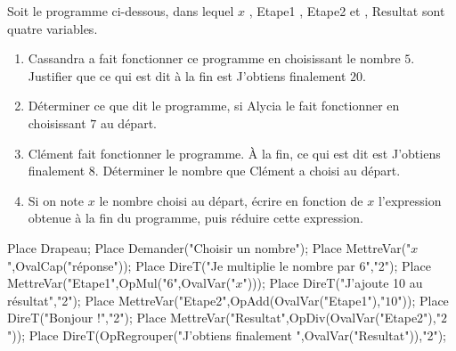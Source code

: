 \begin{exercice*}
    Soit le programme ci-dessous, dans lequel \og{} $x$ \fg{}, \og{} Etape1 \fg{}, \og{} Etape2 \fg{} et , \og{} Resultat \fg{} sont quatre variables.

    \begin{minipage}{0.45\linewidth}
        \begin{enumerate}
            \item Cassandra a fait fonctionner ce programme en choisissant le nombre $5$. Justifier que ce qui est dit à la fin est \og{} J'obtiens finalement $20$\fg{}.
            \item Déterminer ce que dit le programme, si Alycia le fait fonctionner en choisissant $7$ au départ.
            \item Clément fait fonctionner le programme. À la fin, ce qui est dit est \og{} J'obtiens finalement $8$\fg{}. Déterminer le nombre que Clément a choisi au départ.
            \item Si on note $x$ le nombre choisi au départ, écrire en fonction de $x$ l'expression obtenue à la fin du programme, puis réduire cette expression.
        \end{enumerate}        
    \end{minipage}
    \hspace*{5mm}
    \begin{minipage}{0.3\linewidth}        
        \begin{Scratch}[Echelle=0.7]
            Place Drapeau;
            Place Demander("Choisir un nombre");
            Place MettreVar("$x$",OvalCap("réponse"));
            Place DireT("Je multiplie le nombre par $6$","2");
            Place MettreVar("Etape1",OpMul("$6$",OvalVar("$x$")));
            Place DireT("J'ajoute 10 au résultat","2");
            Place MettreVar("Etape2",OpAdd(OvalVar("Etape1"),"$10$"));
            Place DireT("Bonjour !","2");
            Place MettreVar("Resultat",OpDiv(OvalVar("Etape2"),"$2$"));
            Place DireT(OpRegrouper("J'obtiens finalement ",OvalVar("Resultat")),"2");
        \end{Scratch}        
    \end{minipage}   
    \begin{minipage}{0.35\linewidth}
        \vspace*{-25mm}
        \hspace*{10mm}
\end{minipage}
\end{exercice*}
